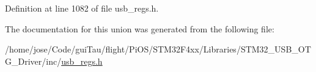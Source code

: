 Definition at line 1082 of file usb\-\_\-regs.\-h.



The documentation for this union was generated from the following file\-:\begin{DoxyCompactItemize}
\item 
/home/jose/\-Code/gui\-Tau/flight/\-Pi\-O\-S/\-S\-T\-M32\-F4xx/\-Libraries/\-S\-T\-M32\-\_\-\-U\-S\-B\-\_\-\-O\-T\-G\-\_\-\-Driver/inc/\hyperlink{_s_t_m32_f4xx_2_libraries_2_s_t_m32___u_s_b___o_t_g___driver_2inc_2usb__regs_8h}{usb\-\_\-regs.\-h}\end{DoxyCompactItemize}
